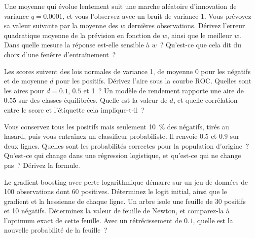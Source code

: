 \begin{question}\label{iq:iv1:machine-learning:33}
Une moyenne qui évolue lentement suit une marche aléatoire d'innovation de variance $q = 0.0001$, et vous l'observez avec un bruit de variance 1. Vous prévoyez sa valeur suivante par la moyenne des $w$ dernières observations. Dérivez l'erreur quadratique moyenne de la prévision en fonction de $w$, ainsi que le meilleur $w$. Dans quelle mesure la réponse est-elle sensible à $w$~? Qu'est-ce que cela dit du choix d'une fenêtre d'entraînement~?
\end{question}

\begin{question}\label{iq:iv1:machine-learning:34}
Les scores suivent des lois normales de variance 1, de moyenne 0 pour les négatifs et de moyenne $d$ pour les positifs. Dérivez l'aire sous la courbe ROC. Quelles sont les aires pour $d = 0.1$, $0.5$ et 1~? Un modèle de rendement rapporte une aire de $0.55$ sur des classes équilibrées. Quelle est la valeur de $d$, et quelle corrélation entre le score et l'étiquette cela implique-t-il~?
\end{question}

\begin{question}\label{iq:iv1:machine-learning:35}
Vous conservez tous les positifs mais seulement 10~\% des négatifs, tirés au hasard, puis vous entraînez un classifieur probabiliste. Il renvoie $0.5$ et $0.9$ sur deux lignes. Quelles sont les probabilités correctes pour la population d'origine~? Qu'est-ce qui change dans une régression logistique, et qu'est-ce qui ne change pas~? Dérivez la formule.
\end{question}

\begin{question}\label{iq:iv1:machine-learning:36}
Le gradient boosting avec perte logarithmique démarre sur un jeu de données de 100 observations dont 60 positives. Déterminez le logit initial, ainsi que le gradient et la hessienne de chaque ligne. Un arbre isole une feuille de 30 positifs et 10 négatifs. Déterminez la valeur de feuille de Newton, et comparez-la à l'optimum exact de cette feuille. Avec un rétrécissement de $0.1$, quelle est la nouvelle probabilité de la feuille~?
\end{question}

